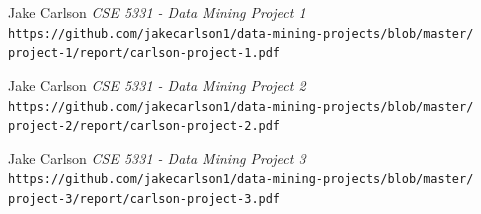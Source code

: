 \documentclass{article}
\begin{document}
\begin{thebibliography}{10}
    Jake Carlson
    \textit{CSE 5331 - Data Mining Project 1}
    \texttt{https://github.com/jakecarlson1/data-mining-projects/blob/master/}
    \texttt{project-1/report/carlson-project-1.pdf}

    Jake Carlson
    \textit{CSE 5331 - Data Mining Project 2}
    \texttt{https://github.com/jakecarlson1/data-mining-projects/blob/master/}
    \texttt{project-2/report/carlson-project-2.pdf}

    Jake Carlson
    \textit{CSE 5331 - Data Mining Project 3}
    \texttt{https://github.com/jakecarlson1/data-mining-projects/blob/master/}
    \texttt{project-3/report/carlson-project-3.pdf}

\end{thebibliography}
\end{document}
